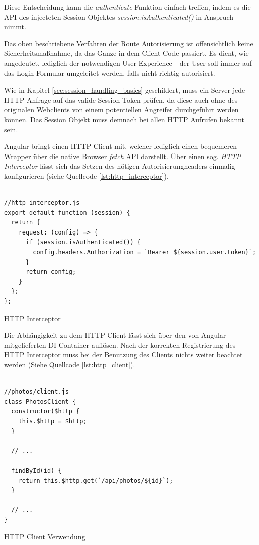 Diese Entscheidung kann die \emph{authenticate} Funktion einfach treffen, indem es die API des injecteten Session Objektes \emph{session.isAuthenticated()} in Anspruch nimmt.

Das oben beschriebene Verfahren der Route Autorisierung ist offensichtlich keine Sicherheitsmaßnahme, da das Ganze in dem Client Code passiert. Es dient, wie angedeutet, lediglich der notwendigen User Experience - der User soll immer auf das Login Formular umgeleitet werden, falls nicht richtig autorisiert.

Wie in Kapitel \ref{sec:session_handling_basics} geschildert, muss ein Server jede HTTP Anfrage auf das valide Session Token prüfen, da diese auch ohne des originalen Webclients von einem potentiellen Angreifer durchgeführt werden können. Das Session Objekt muss demnach bei allen HTTP Aufrufen bekannt sein.

Angular bringt einen HTTP Client mit, welcher lediglich einen bequemeren Wrapper über die native Browser \emph{fetch} API darstellt. Über einen sog. \emph{HTTP Interceptor} lässt sich das Setzen des nötigen Autorisierungheaders einmalig konfigurieren (siehe Quellcode \ref{lst:http_interceptor}).

\begin{listing}[H]
\begin{verbatim}

//http-interceptor.js
export default function (session) {
  return {
    request: (config) => {
      if (session.isAuthenticated()) {
        config.headers.Authorization = `Bearer ${session.user.token}`;
      }
      return config;
    }
  };
};

\end{verbatim}
\caption{HTTP Interceptor}
\label{lst:http_interceptor}
\end{listing}

Die Abhängigkeit zu dem HTTP Client lässt sich über den von Angular mitgelieferten DI-Container auflösen. Nach der korrekten Registrierung des HTTP Interceptor muss bei der Benutzung des Clients nichts weiter beachtet werden (Siehe Quellcode \ref{lst:http_client}).

\begin{listing}[H]
\begin{verbatim}

//photos/client.js
class PhotosClient {
  constructor($http {
    this.$http = $http;
  }

  // ...

  findById(id) {
    return this.$http.get(`/api/photos/${id}`);
  }

  // ...
}

\end{verbatim}
\caption{HTTP Client Verwendung}
\label{lst:http_client}
\end{listing}

